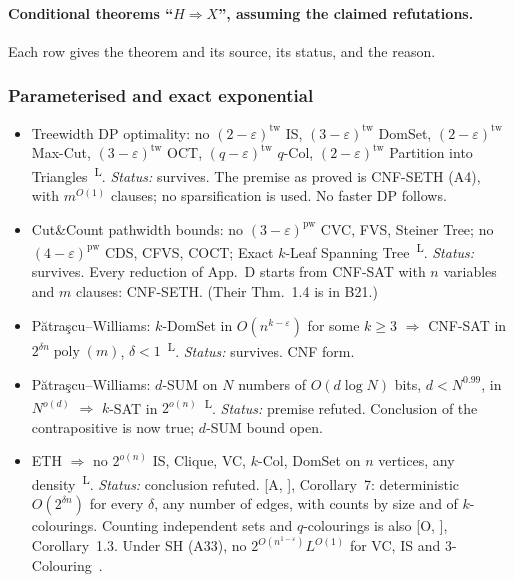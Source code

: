 \documentclass[10pt]{amsart}
\theoremstyle{plain}
\theoremstyle{definition}
\theoremstyle{remark}
\numberwithin{equation}{section}
\newcommand{\poly}{\operatorname{poly}}
\newcommand{\A}[1][]{\textup{[A\if\relax\detokenize{#1}\relax\else, #1\fi]}}
\newcommand{\Oa}[1][]{\textup{[O\if\relax\detokenize{#1}\relax\else, #1\fi]}}
\newcommand{\Lit}{\textsuperscript{L}}
\begin{document}
\paragraph{Conditional theorems ``$H\Rightarrow X$'', assuming the claimed refutations.}
Each row gives the theorem and its source, its status, and the reason.
{\small
\subsubsection*{Parameterised and exact exponential}
\begin{itemize}[leftmargin=2.6em,itemsep=2pt]
\item[B1] Treewidth DP optimality: no $(2-\varepsilon)^{\mathrm{tw}}$ IS, $(3-\varepsilon)^{\mathrm{tw}}$ DomSet, $(2-\varepsilon)^{\mathrm{tw}}$ Max-Cut, $(3-\varepsilon)^{\mathrm{tw}}$ OCT, $(q-\varepsilon)^{\mathrm{tw}}$ $q$-Col, $(2-\varepsilon)^{\mathrm{tw}}$ Partition into Triangles~\cite{LMS11tw}\Lit. \emph{Status:} survives. The premise as proved is CNF-SETH (A4), with $m^{O(1)}$ clauses; no sparsification is used. No faster DP follows.
\item[B2] Cut\&Count pathwidth bounds: no $(3-\varepsilon)^{\mathrm{pw}}$ CVC, FVS, Steiner Tree; no $(4-\varepsilon)^{\mathrm{pw}}$ CDS, CFVS, COCT; Exact $k$-Leaf Spanning Tree~\cite[Thm.~1.3, App.~D]{CutAndCount11}\Lit. \emph{Status:} survives. Every reduction of App.~D starts from CNF-SAT with $n$ variables and $m$ clauses: CNF-SETH. (Their Thm.~1.4 is in B21.)
\item[B3] P\u{a}tra\c{s}cu--Williams: $k$-DomSet in $O(n^{k-\varepsilon})$ for some $k\ge3$ $\Rightarrow$ CNF-SAT in $2^{\delta n}\poly(m)$, $\delta<1$~\cite[Thm.~2.1]{PW10}\Lit. \emph{Status:} survives. CNF form.
\item[B4] P\u{a}tra\c{s}cu--Williams: $d$-SUM on $N$ numbers of $O(d\log N)$ bits, $d<N^{0.99}$, in $N^{o(d)}$ $\Rightarrow$ $k$-SAT in $2^{o(n)}$~\cite[\S5]{PW10}\Lit. \emph{Status:} premise refuted. Conclusion of the contrapositive is now true; $d$-SUM bound open.
\item[B13] ETH $\Rightarrow$ no $2^{o(n)}$ IS, Clique, VC, $k$-Col, DomSet on $n$ vertices, any density~\cite{IPZ01,LMS11}\Lit. \emph{Status:} conclusion refuted. \A, Corollary~7: deterministic $O(2^{\delta n})$ for every $\delta$, any number of edges, with counts by size and of $k$-colourings. Counting independent sets and $q$-colourings is also \Oa, Corollary~1.3. Under SH (A33), no $2^{O(n^{1-\varepsilon})}L^{O(1)}$ for VC, IS and $3$-Colouring~\cite[Table~1]{MIT26}.

\end{itemize}}
\end{document}
